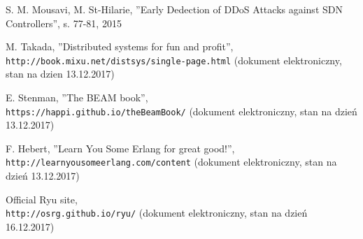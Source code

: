 \begin{thebibliography}{99}
S. M. Mousavi, M. St-Hilarie,
''Early Dedection of DDoS Attacks against SDN Controllers'',
s. 77-81, 2015

M. Takada,
''Distributed systems for fun and profit'',
\\\texttt{http://book.mixu.net/distsys/single-page.html} (dokument
elektroniczny, stan na dzien 13.12.2017)

E. Stenman,
''The BEAM book'',
\\\texttt{https://happi.github.io/theBeamBook/} (dokument elektroniczny, stan na
dzień 13.12.2017)

F. Hebert,
''Learn You Some Erlang for great good!'',
\\\texttt{http://learnyousomeerlang.com/content} (dokument elektroniczny, stan
na dzień 13.12.2017)

Official Ryu site,
\\\texttt{http://osrg.github.io/ryu/} (dokument elektroniczny, stan
na dzień 16.12.2017)
\end{thebibliography}